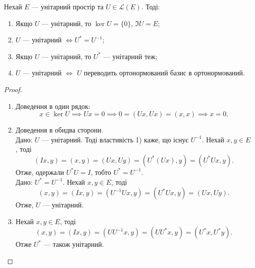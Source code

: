\documentclass{math_library}
\begin{document}
\begin{proposition}
Нехай $E$ --- унітарний простір та $U \in \mathcal{L}(E)$. Тоді:
\begin{enumerate}[nosep,wide=0pt,label={\arabic*)}]
\item Якщо $U$ --- унітарний, то $\ker U = \{0\}$, \qquad $\Im U = E$;
\item $U$ --- унітарний $\iff U^* = U^{-1}$;
\item Якщо $U$ --- унітарний, то $U^*$ --- унітарний теж;
\item $U$ --- унітарний $\iff$ $U$ переводить ортонормований базис в ортонормований.
\end{enumerate}
\end{proposition}

\begin{proof}
\begin{enumerate}[topsep=0pt, wide=0pt, label={\arabic*)}]
\item Доведення в один рядок: 
\[
x \in \ker U \implies Ux = 0 \implies 0 = (Ux, Ux) = (x,x) \implies x = 0.
\]

\item Доведення в обидва сторони.\\
\rightproof Дано: $U$ --- унітарний. Тоді властивість 1) каже, що існує $U^{-1}$. Нехай $x,y \in E$, тоді
\[
(Ix,y) = (x,y) = (Ux,Uy) = (U^*(Ux), y) = (U^*Ux,y).
\]
Отже, одержали $U^*U = I$, тобто $U^* = U^{-1}$.
\bigskip \\
\leftproof Дано: $U^* = U^{-1}$. Нехай $x,y \in E$, тоді
\[
(x,y) = (Ix, y) = (U^{-1}Ux, y) = (U^*Ux,y) = (Ux, Uy).
\]
Отже, $U$ --- унітарний.

\item Нехай $x,y \in E$, тоді 
\[
(x,y) = (Ix,y) = (UU^{-1}x,y) = (UU^* x,y) = (U^*x,U^*y).
\]
Отже $U^*$ --- також унітарний.


\end{enumerate}
\end{proof}
\end{document}
